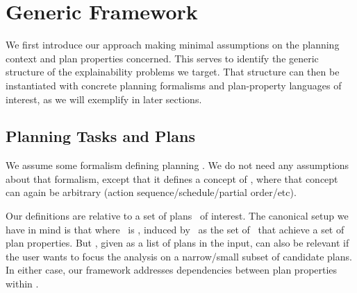 \section{Generic Framework}
\label{framework}

We first introduce our approach making minimal assumptions on the
planning context and plan properties concerned. This serves to
identify the generic structure of the explainability problems we
target. That structure can then be instantiated with concrete planning
formalisms and plan-property languages of interest, as we will
exemplify in later sections.




\subsection{Planning Tasks and Plans}

We assume some formalism defining planning  \task. We
do not need any assumptions about that formalism, except that it
defines a concept of  \plan, where that concept can
again be arbitrary (action sequence/schedule/partial order/etc). 

Our definitions are relative to a set of plans \plans\ of
interest. The canonical setup we have in mind is that where \plans\ is
, induced by \task\ as the set of \plan\ that
achieve a set of  plan properties. But
 \plans, given as a list of plans in the input, can
also be relevant if the user wants to focus the analysis on a
narrow/small subset of candidate plans. In either case, our framework
addresses dependencies between  plan properties
within \plans.
%
%





